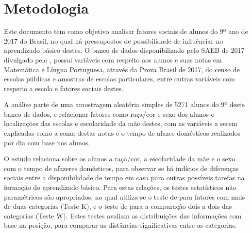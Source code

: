 


\chapter{Metodologia}

Este documento tem como objetivo analisar fatores sociais de alunos do 9º ano de 2017 do Brasil,
no qual há pressupostos de possibilidade de influênciar no aprendizado básico destes. O banco de dados
disponibilizado pelo SAEB de 2017 divulgado pelo , possui variáveis com respeito
aos alunos e suas notas em Matemática e Língua Portuguesa, através da Prova Brasil de 2017, do censo de 
escolas públicas e amostras de escolas particulares, entre outras variáveis com respeito a escola e fatores
sociais destes.

A análise parte de uma amostragem aleatória simples de 5271 alunos do 9º deste banco de dados, e relacionar 
fatores como raça/cor e sexo dos alunos e localizações das escolas e escolaridade da mãe destes, com as variáveis
a serem explicadas como a soma destas notas e o tempo de afazes domésticos realizados por dia com base nos alunos.

O estudo relaciona sobre os alunos a raça/cor, a escolaridade da mãe e o sexo com o tempo de afazeres domésticos, 
para observar se há indícios de diferenças sociais entre a disponibilidade de tempo em casa para outras possíveis 
tarefas na formação do aprendizado básico. Para estas relações, os testes estatísticos não paramétricos são apropriados,
no qual utiliza-se o teste de  para fatores com mais de duas categorias (Teste K), e o
teste de  para a comparação dois a dois das categorias (Teste W). Estes testes avaliam as
distribuições das informações com base na posição, para comparar as distâncias significativas entre as categorias.

